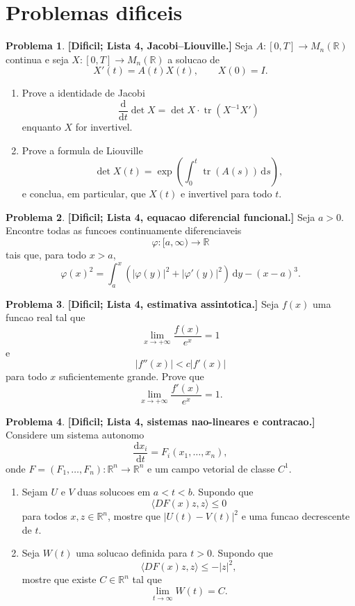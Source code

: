 \documentclass[10pt,a4paper]{amsart}
\newcommand{\R}{\mathbb{R}}
\renewcommand{\d}{\mathrm{d}}
\theoremstyle{definition}
\newtheorem{problema}{Problema}
\begin{document}
\section*{Problemas dificeis}

\begin{problema}
\textbf{[Dificil; Lista 4, Jacobi--Liouville.]}
Seja $A:[0,T]\to M_n(\R)$ continua e seja $X:[0,T]\to M_n(\R)$ a solucao de
\[
    X'(t)=A(t)X(t),
    \qquad X(0)=I.
\]
\begin{enumerate}[label=(\alph*)]
    \item Prove a identidade de Jacobi
    \[
        \frac{\d}{\d t}\det X=\det X\cdot\operatorname{tr}(X^{-1}X')
    \]
    enquanto $X$ for invertivel.
    \item Prove a formula de Liouville
    \[
        \det X(t)=\exp\left(\int_0^t \operatorname{tr}(A(s))\,\d s\right),
    \]
    e conclua, em particular, que $X(t)$ e invertivel para todo $t$.
\end{enumerate}
\end{problema}

\begin{problema}
\textbf{[Dificil; Lista 4, equacao diferencial funcional.]}
Seja $a>0$. Encontre todas as funcoes continuamente diferenciaveis
\[
    \varphi:[a,\infty)\to\R
\]
tais que, para todo $x>a$,
\[
    \varphi(x)^2
    =
    \int_a^x \left(|\varphi(y)|^2+|\varphi'(y)|^2\right)\,\d y
    -(x-a)^3.
\]
\end{problema}

\begin{problema}
\textbf{[Dificil; Lista 4, estimativa assintotica.]}
Seja $f(x)$ uma funcao real tal que
\[
    \lim_{x\to+\infty}\frac{f(x)}{e^x}=1
\]
e
\[
    |f''(x)|<c|f'(x)|
\]
para todo $x$ suficientemente grande. Prove que
\[
    \lim_{x\to+\infty}\frac{f'(x)}{e^x}=1.
\]
\end{problema}

\begin{problema}
\textbf{[Dificil; Lista 4, sistemas nao-lineares e contracao.]}
Considere um sistema autonomo
\[
    \frac{\d x_i}{\d t}=F_i(x_1,\dots,x_n),
\]
onde $F=(F_1,\dots,F_n):\R^n\to\R^n$ e um campo vetorial de classe $C^1$.
\begin{enumerate}[label=(\alph*)]
    \item Sejam $U$ e $V$ duas solucoes em $a<t<b$. Supondo que
    \[
        \langle DF(x)z,z\rangle\le 0
    \]
    para todos $x,z\in\R^n$, mostre que $|U(t)-V(t)|^2$ e uma funcao
    decrescente de $t$.
    \item Seja $W(t)$ uma solucao definida para $t>0$. Supondo que
    \[
        \langle DF(x)z,z\rangle\le -|z|^2,
    \]
    mostre que existe $C\in\R^n$ tal que
    \[
        \lim_{t\to\infty}W(t)=C.
    \]
\end{enumerate}
\end{problema}
\end{document}
